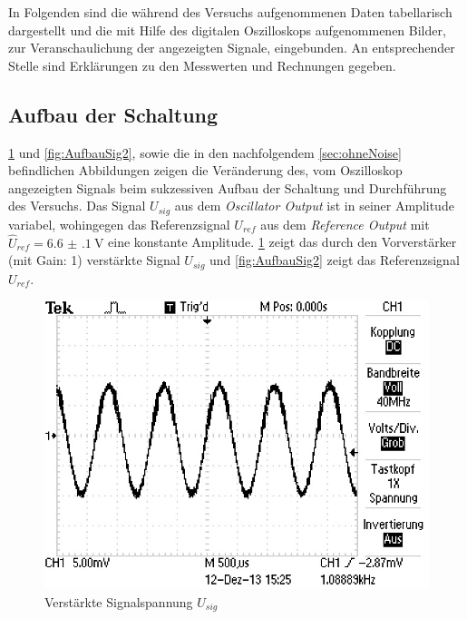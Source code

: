 In Folgenden sind die während des Versuchs aufgenommenen Daten tabellarisch dargestellt und die 
mit Hilfe des digitalen Oszilloskops aufgenommenen Bilder, zur Veranschaulichung der angezeigten Signale,
eingebunden. An entsprechender Stelle sind Erklärungen zu den Messwerten und Rechnungen gegeben.   

\subsection{Aufbau der Schaltung}
	\cref{fig:AufbauSig1} und \ref{fig:AufbauSig2}, sowie die in den nachfolgendem \cref{sec:ohneNoise} befindlichen Abbildungen zeigen die Veränderung des, vom Oszilloskop angezeigten Signals 
	beim sukzessiven Aufbau der Schaltung und Durchführung des Versuchs.
	Das Signal $U_{sig}$ aus dem \emph{Oscillator Output} ist in seiner Amplitude variabel, wohingegen das Referenzsignal $U_{ref}$ 
	aus dem \emph{Reference Output} mit $\hat{U}_{ref} = \SI{6.6(1)}{\volt} $ eine konstante Amplitude.   
	\cref{fig:AufbauSig1} zeigt das durch den Vorverstärker (mit Gain: 1) verstärkte Signal $U_{sig}$  und \cref{fig:AufbauSig2} 
	zeigt das Referenzsignal $U_{ref}$.
	
	\begin{figure}[!h]
		\centering
		\includegraphics[scale=0.4]{Grafiken/Signalspannung.jpg}
		\caption{Verstärkte Signalspannung $U_{sig}$}
		\label{fig:AufbauSig1}
	\end{figure}
	
